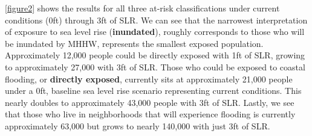 \documentclass[12pt,]{article}
\begin{document}
\autoref{figure2} shows the results for all three at-risk
classifications under current conditions (0ft) through 3ft of SLR. We
can see that the narrowest interpretation of exposure to sea level rise
(\textbf{inundated}), roughly corresponds to those who will be inundated
by MHHW, represents the smallest exposed population. Approximately
12,000 people could be directly exposed with 1ft of SLR, growing to
approximately 27,000 with 3ft of SLR. Those who could be exposed to
coastal flooding, or \textbf{directly exposed}, currently sits at
approximately 21,000 people under a 0ft, baseline sea level rise
scenario representing current conditions. This nearly doubles to
approximately 43,000 people with 3ft of SLR. Lastly, we see that those
who live in neighborhoods that will experience flooding is currently
approximately 63,000 but grows to nearly 140,000 with just 3ft of SLR.
\newpage
\singlespacing 

\end{document}
